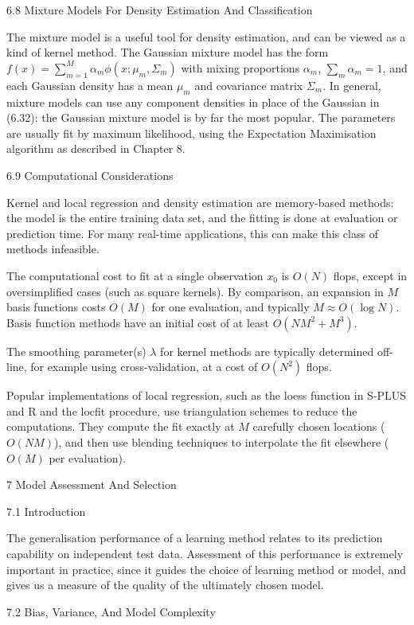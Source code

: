 6.8 Mixture Models For Density Estimation And Classification

The mixture model is a useful tool for density estimation, and can be viewed as a kind of kernel method. The Gaussian mixture model has the form $f(x)=\sum_{m=1}^M \alpha_m \phi (x;\mu_m,\Sigma_m)$ with mixing proportions $\alpha_m$, $\sum_m \alpha_m=1$, and each Gaussian density has a mean $\mu_m$ and covariance matrix $\Sigma_m$. In general, mixture models can use any component densities in place of the Gaussian in (6.32): the Gaussian mixture model is by far the most popular. The parameters are usually fit by maximum likelihood, using the Expectation Maximisation algorithm as described in Chapter 8.

6.9 Computational Considerations

Kernel and local regression and density estimation are memory-based methods: the model is the entire training data set, and the fitting is done at evaluation or prediction time. For many real-time applications, this can make this class of methods infeasible.

The computational cost to fit at a single observation $x_0$ is $O(N)$ flops, except in oversimplified cases (such as square kernels). By comparison, an expansion in $M$ basis functions costs $O(M)$ for one evaluation, and typically $M \approx O(\log N)$. Basis function methods have an initial cost of at least $O(NM^2+M^3)$.

The smoothing parameter(s) $\lambda$ for kernel methods are typically determined off-line, for example using cross-validation, at a cost of $O(N^2)$ flops.

Popular implementations of local regression, such as the loess function in S-PLUS and R and the locfit procedure, use triangulation schemes to reduce the computations. They compute the fit exactly at $M$ carefully chosen locations ($O(NM)$), and then use blending techniques to interpolate the fit elsewhere ($O(M)$ per evaluation).

7 Model Assessment And Selection

7.1 Introduction

The generalisation performance of a learning method relates to its prediction capability on independent test data. Assessment of this performance is extremely important in practice, since it guides the choice of learning method or model, and gives us a measure of the quality of the ultimately chosen model.

7.2 Bias, Variance, And Model Complexity

